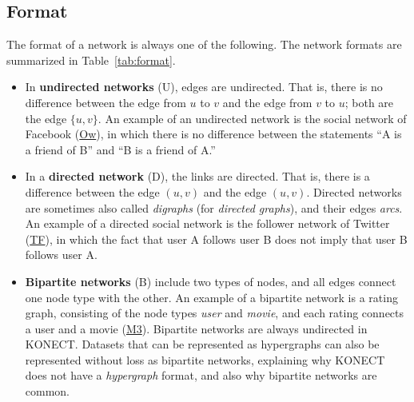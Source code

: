 \documentclass{article}
\begin{document}
\subsection{Format}
The format of a network is always one of the following.  The network
formats are summarized in Table~\ref{tab:format}. 
\begin{itemize}
\item 
  In \textbf{undirected networks} (U), 
  edges are undirected.  That is,
  there is no difference between the edge from $u$ to $v$ and the edge
  from $v$ to $u$; both are the edge $\{u,v\}$. 
  An example of an undirected network is the social network of
  Facebook
  (\href{http://konect.cc/networks/facebook-wosn-wall/}{\textsf{Ow}}),
  in which there is no difference between the statements ``A 
  is a friend of B'' and ``B is a friend of A.''
\item In a \textbf{directed network} (D), 
  the links are directed. That is, there is a
  difference between the edge $(u,v)$ and the edge $(u,v)$. 
  Directed networks are sometimes also called \emph{digraphs} (for \emph{directed
    graphs}), and their edges \emph{arcs}. 
  An example of a directed social network is the follower network of
  Twitter
  (\href{http://konect.cc/networks/twitter_mpi/}{\textsf{TF}}),
  in which the fact that user A follows user B does not imply 
  that user B follows user A. 
\item \textbf{Bipartite networks} (B) 
  include two types of nodes, and all edges
  connect one node type with the other. An example of a bipartite
  network is a rating graph, consisting of the node types \emph{user}
  and \emph{movie}, and each rating connects a user and a movie
  (\href{http://konect.cc/networks/movielens-10m_rating/}{\textsf{M3}}).  
  Bipartite networks are always undirected in KONECT.  Datasets that can
  be represented as hypergraphs can also be represented without loss as
  bipartite networks, explaining why KONECT does not have a
  \emph{hypergraph} format, and also why bipartite networks are common. 
\end{itemize}

\begin{table}
  \caption{
    The network formats allowed in KONECT.
    Each network dataset is exactly of one type.  
    \label{tab:format}
  }
  \centering
{}
\end{table}
\end{document}
